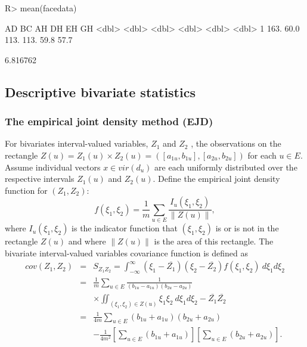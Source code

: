 \documentclass[article]{jss}
\begin{document}
\begin{CodeChunk}
\begin{CodeInput}
R> mean(facedata)
\end{CodeInput}
\begin{CodeOutput}
	    AD    BC    AH    DH    EH    GH
	  <dbl> <dbl> <dbl> <dbl> <dbl> <dbl>
1  	163.  60.0  113.  113.  59.8  57.7
\end{CodeOutput}

\begin{CodeOutput}
[1] 6.816762
\end{CodeOutput}

\subsection{Descriptive bivariate statistics}



\subsubsection{The empirical joint density method (EJD)}
For bivariates interval-valued variables, $Z_1$ and $Z_2$ , the 
observations on the rectangle 
$Z(u)= Z_1(u)\times Z_2(u) = ([a_{1u}, b_{1u}],
[a_{2u}, b_{2u}])$ for each $u \in E$. 
Assume individual vectors $x \in vir(d_u)$ are each uniformly distributed over 
the respective intervals $Z_1(u)$ and $Z_2(u)$.
Define the empirical joint density function for $(Z_1, Z_2)$:
\[ 
f(\xi_1, \xi_2)=
\frac{1}{m}\sum_{u \in E} \frac{I_u(\xi_1, \xi_2)}{\|Z(u)\|},
\]
where $I_u(\xi_1, \xi_2)$ is the indicator function that $(\xi_1, \xi_2)$ is or 
is not in the rectangle $Z(u)$ and where $\|Z(u)\|$ is the area of
this rectangle.  The bivariate interval-valued variables covariance function is 
defined as
\begin{eqnarray*}
cov(Z_1, Z_2)&=&  S_{Z_1 Z_2} =
\int_{-\infty}^{\infty}
(\xi_1 - \bar{Z_1})(\xi_2 -\bar{Z_2})f(\xi_1, \xi_2)\ d\xi_1 d\xi_2\\
&=&
\frac{1}{m} \sum_{u \in E}
\frac{1}{(b _{1u}-a_{1u})(b_{2u}-a_{2u})} \\
&&\times \iint_{(\xi_1, \xi_2)\in Z(u)}
\xi_1 \xi_2\ d\xi_1 d\xi_2 -\bar{Z_1}\bar{Z_2}\\
&=&
\frac{1}{4m}
\sum_{u \in E}(b_{1u}+ a_{1u})(b_{2u} + a_{2u}) \\
&&-\frac{1}{4m^2}\left[ \sum_{u \in E}
(b_{1u}+a_{1u})\right]\left[\sum_{u \in E}
(b_{2u}+a_{2u})\right].
\end{eqnarray*}



\end{CodeChunk}
\end{document}
